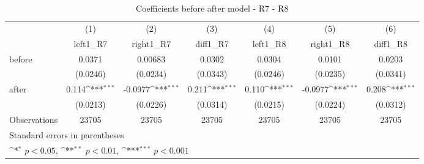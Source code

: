 \begin{table}[!ht]\centering \footnotesize
\def\sym#1{\ifmmode^{#1}\else\(^{#1}\)\fi}
\caption{Coefficients before after model - R7 - R8}
\begin{tabular}{l*{6}{c}}
\hline\hline
                    &\multicolumn{1}{c}{(1)}&\multicolumn{1}{c}{(2)}&\multicolumn{1}{c}{(3)}&\multicolumn{1}{c}{(4)}&\multicolumn{1}{c}{(5)}&\multicolumn{1}{c}{(6)}\\
                    &\multicolumn{1}{c}{left1\_R7}&\multicolumn{1}{c}{right1\_R7}&\multicolumn{1}{c}{diff1\_R7}&\multicolumn{1}{c}{left1\_R8}&\multicolumn{1}{c}{right1\_R8}&\multicolumn{1}{c}{diff1\_R8}\\
\hline
before              &      0.0371         &     0.00683         &      0.0302         &      0.0304         &      0.0101         &      0.0203         \\
                    &    (0.0246)         &    (0.0234)         &    (0.0343)         &    (0.0246)         &    (0.0235)         &    (0.0341)         \\
[1em]
after               &       0.114\sym{***}&     -0.0977\sym{***}&       0.211\sym{***}&       0.110\sym{***}&     -0.0977\sym{***}&       0.208\sym{***}\\
                    &    (0.0213)         &    (0.0226)         &    (0.0314)         &    (0.0215)         &    (0.0224)         &    (0.0312)         \\
\hline
Observations        &       23705         &       23705         &       23705         &       23705         &       23705         &       23705         \\
\hline\hline
\multicolumn{7}{l}{\footnotesize Standard errors in parentheses}\\
\multicolumn{7}{l}{\footnotesize \sym{*} \(p<0.05\), \sym{**} \(p<0.01\), \sym{***} \(p<0.001\)}\\
\end{tabular}
\end{table}
